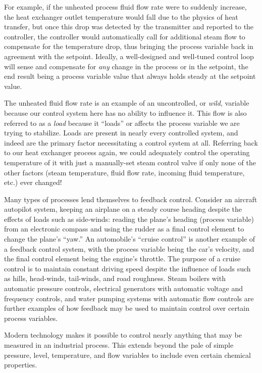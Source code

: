 For example, if the unheated process fluid flow rate were to suddenly increase, the heat exchanger outlet temperature would fall due to the physics of heat transfer, but once this drop was detected by the transmitter and reported to the controller, the controller would automatically call for additional steam flow to compensate for the temperature drop, thus bringing the process variable back in agreement with the setpoint.  Ideally, a well-designed and well-tuned control loop will sense and compensate for \textit{any} change in the process or in the setpoint, the end result being a process variable value that always holds steady at the setpoint value.

The unheated fluid flow rate is an example of an uncontrolled, or \textit{wild}, variable because our control system here has no ability to influence it.  This flow is also referred to as a \textit{load} because it ``loads'' or affects the process variable we are trying to stabilize.  Loads are present in nearly every controlled system, and indeed are the primary factor necessitating a control system at all.  Referring back to our heat exchanger process again, we could adequately control the operating temperature of it with just a manually-set steam control valve if only none of the other factors (steam temperature, fluid flow rate, incoming fluid temperature, etc.) ever changed!    

\vskip 10pt

Many types of processes lend themselves to feedback control.  Consider an aircraft autopilot system, keeping an airplane on a steady course heading despite the effects of loads such as side-winds: reading the plane's heading (process variable) from an electronic compass and using the rudder as a final control element to change the plane's ``yaw.''  An automobile's ``cruise control'' is another example of a feedback control system, with the process variable being the car's velocity, and the final control element being the engine's throttle.  The purpose of a cruise control is to maintain constant driving speed despite the influence of loads such as hills, head-winds, tail-winds, and road roughness.  Steam boilers with automatic pressure controls, electrical generators with automatic voltage and frequency controls, and water pumping systems with automatic flow controls are further examples of how feedback may be used to maintain control over certain process variables.

Modern technology makes it possible to control nearly anything that may be measured in an industrial process.  This extends beyond the pale of simple pressure, level, temperature, and flow variables to include even certain chemical properties.

